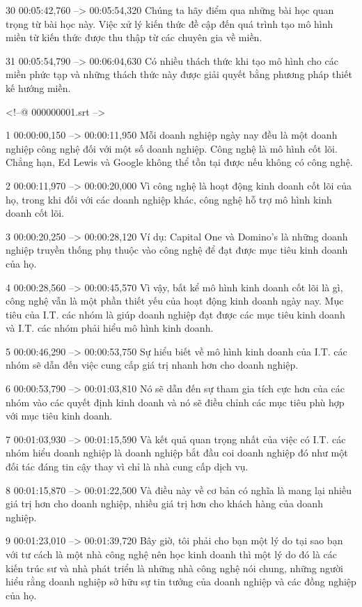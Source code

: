 30
00:05:42,760 --> 00:05:54,320
Chúng ta hãy điểm qua những bài học quan trọng từ bài học này.  Việc xử lý kiến ​​thức đề cập đến quá trình tạo mô hình miền từ kiến ​​thức được thu thập từ các chuyên gia về miền.

31
00:05:54,790 --> 00:06:04,630
Có nhiều thách thức khi tạo mô hình cho các miền phức tạp và những thách thức này được giải quyết bằng phương pháp thiết kế hướng miền.

<!--@ 000000001.srt -->

1
00:00:00,150 --> 00:00:11,950
Mỗi doanh nghiệp ngày nay đều là một doanh nghiệp công nghệ đối với một số doanh nghiệp.  Công nghệ là mô hình cốt lõi.  Chẳng hạn, Ed Lewis và Google không thể tồn tại được nếu không có công nghệ.

2
00:00:11,970 --> 00:00:20,000
Vì công nghệ là hoạt động kinh doanh cốt lõi của họ, trong khi đối với các doanh nghiệp khác, công nghệ hỗ trợ mô hình kinh doanh cốt lõi.

3
00:00:20,250 --> 00:00:28,120
Ví dụ: Capital One và Domino's là những doanh nghiệp truyền thống phụ thuộc vào công nghệ để đạt được mục tiêu kinh doanh của họ.

4
00:00:28,560 --> 00:00:45,570
Vì vậy, bất kể mô hình kinh doanh cốt lõi là gì, công nghệ vẫn là một phần thiết yếu của hoạt động kinh doanh ngày nay.  Mục tiêu của I.T.  các nhóm là giúp doanh nghiệp đạt được các mục tiêu kinh doanh và I.T.  các nhóm phải hiểu mô hình kinh doanh.

5
00:00:46,290 --> 00:00:53,750
Sự hiểu biết về mô hình kinh doanh của I.T.  các nhóm sẽ dẫn đến việc cung cấp giá trị nhanh hơn cho doanh nghiệp.

6
00:00:53,790 --> 00:01:03,810
Nó sẽ dẫn đến sự tham gia tích cực hơn của các nhóm vào các quyết định kinh doanh và nó sẽ điều chỉnh các mục tiêu phù hợp với mục tiêu kinh doanh.

7
00:01:03,930 --> 00:01:15,590
Và kết quả quan trọng nhất của việc có I.T.  các nhóm hiểu doanh nghiệp là doanh nghiệp bắt đầu coi doanh nghiệp đó như một đối tác đáng tin cậy thay vì chỉ là nhà cung cấp dịch vụ.

8
00:01:15,870 --> 00:01:22,500
Và điều này về cơ bản có nghĩa là mang lại nhiều giá trị hơn cho doanh nghiệp, nhiều giá trị hơn cho khách hàng của doanh nghiệp.

9
00:01:23,010 --> 00:01:39,720
Bây giờ, tôi phải cho bạn một lý do tại sao bạn với tư cách là một nhà công nghệ nên học kinh doanh thì một lý do đó là các kiến ​​trúc sư và nhà phát triển là những nhà công nghệ nói chung, những người hiểu rằng doanh nghiệp sở hữu sự tin tưởng của doanh nghiệp và các đồng nghiệp của họ.

